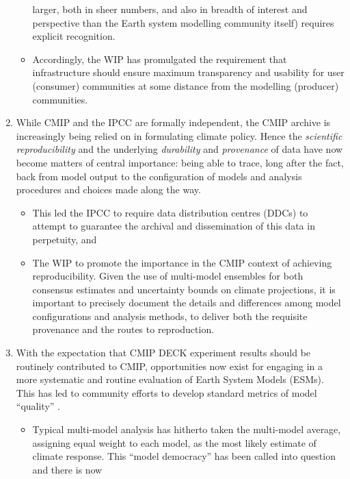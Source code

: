 \documentclass[gmd,manuscript]{copernicus}
\newcommand{\pipref}[1] {\citep{ref:#1}}
\begin{document}
\begin{enumerate}
\begin{itemize}
    larger, both in sheer numbers, and also in breadth of interest
    and perspective than the Earth system modelling community itself)
    requires explicit recognition.
  \item Accordingly, the WIP has promulgated the requirement that 
    infrastructure should ensure maximum transparency and usability
    for user (consumer) communities at some distance from the modelling
    (producer) communities.
  \end{itemize}
\item\label{repro} While CMIP and the IPCC are formally independent,
  the CMIP archive is increasingly being relied on in formulating
  climate policy. Hence the \emph{scientific reproducibility}
  \pipref{collinstabak2014} and the underlying \emph{durability} and
  \emph{provenance} of data have now become matters of central
  importance: being able to trace, long after the fact, back from
  model output to the configuration of models and analysis procedures
  and choices made along the way.
  \begin{itemize}
  \item This led the IPCC to require data distribution centres (DDCs)
    to attempt to guarantee the archival and dissemination of this
    data in perpetuity, and
  \item The WIP to promote the importance in the CMIP context of
    achieving reproducibility. Given the use of multi-model ensembles
    for both consensus estimates and uncertainty bounds on climate
    projections, it is important to precisely document the details and 
    differences among model configurations and analysis methods, to 
    deliver both the requisite provenance and the routes to reproduction.
  \end{itemize}
\item\label{analysis} With the expectation that CMIP DECK experiment
  results should be routinely contributed to CMIP, opportunities now
  exist for engaging in a more systematic and routine evaluation of
  Earth System Models (ESMs). This has led to community efforts to
  develop standard metrics of model ``quality''
  \citep{ref:eyringetal2016,ref:gleckleretal2016}.
  \begin{itemize}
  \item Typical multi-model analysis has hitherto taken the
    multi-model average, assigning equal weight to each model, as the
    most likely estimate of climate response. This ``model democracy''
    \pipref{knutti2010} has been called into question and there is now

\end{itemize}
\end{enumerate}
\end{document}
